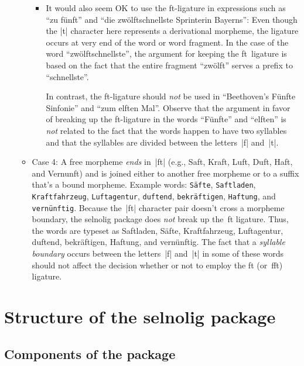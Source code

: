 \documentclass[11pt]{article}
\newcommand{\pkg}[1]{\textsf{#1}}
\newcommand{\opt}[1]{\texttt{#1}}
\begin{document}
\begin{itemize}
\begin{itemize}
\begin{itemize}
\item It would also seem OK to use the ft-ligature in expressions such as \enquote{zu fünft} and \enquote{die zwölftschnellste Sprinterin Bayerns}: Even though the |t| character here represents a derivational morpheme, the ligature occurs at very end of the word or word fragment. In the case of the word \enquote{zwölftschnellste}, the argument for keeping the ft~ligature is based on the fact that the entire fragment \enquote{zwölft} serves a prefix to \enquote{schnellste}. 

In contrast, the ft-ligature should \emph{not} be used in \enquote{Beethoven's Fünfte Sinfonie} and \enquote{zum elften Mal}. Observe that the argument in favor of breaking up the ft-ligature in the words \enquote{Fünfte} and \enquote{elften} is \emph{not} related to the fact that the words happen to have two syllables and that the syllables are divided between the letters~|f| and~|t|.

\end{itemize}

\item Case 4: A free morpheme \emph{ends} in~|ft| (e.g., Saft, Kraft, Luft, Duft, Haft, and Vernunft) and is joined either to another free morpheme or to a suffix that's a bound morpheme. Example words: \opt{Säfte}, \opt{Saftladen}, \opt{Kraftfahrzeug}, \opt{Luftagentur}, \opt{duftend}, \opt{bekräftigen}, \opt{Haftung}, and \opt{vernünftig}. Because the~|ft| character pair doesn't cross a morpheme boundary, the \pkg{selnolig} package does \emph{not} break up the~ft ligature. Thus, the words are typeset as Saftladen, Säfte, Kraftfahrzeug, Luftagentur, duftend, bekräftigen, Haftung, and vernünftig. The fact that a \emph{syllable boundary} occurs between the letters~|f| and~|t| in some of these words should not affect the decision whether or not to employ the ft (or~fft) ligature.
\end{itemize}
\end{itemize}



\section[Structure of the selnolig package]{Structure of the \pkg{selnolig} package} \label{sec:structure}

\subsection{Components of the package}
\end{document}
